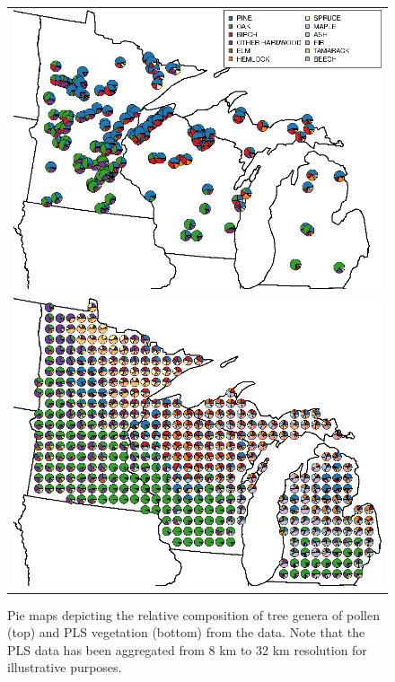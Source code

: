 \begin{figure}
\centering
\begin{tabular}{c}
\includegraphics[width=5in]{figures/pie_plot_pollen_ALL_v0_3.png} \\
\includegraphics[width=5in]{figures/pie_plot_pls_ALL_v0_3.png}
\end{tabular}
\caption[Pie maps]{\internallinenumbers \doublespacing Pie maps depicting the relative composition of tree genera of
  pollen (top) and PLS vegetation (bottom) from the data. Note that
  the PLS data has been aggregated from 8 km to 32 km resolution for
  illustrative purposes.}
\label{fig:pie}
\end{figure}

